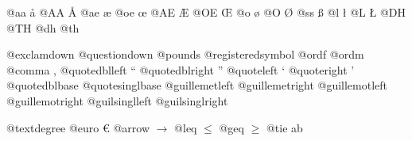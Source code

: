 \documentclass{book}
\begin{document}
\begin{titlepage}
@aa \aa{}
@AA \AA{}
@ae \ae{}
@oe \oe{}
@AE \AE{}
@OE \OE{}
@o \o{}
@O \O{}
@ss \ss{}
@l \l{}
@L \L{}
@DH \DH{}
@TH \TH{}
@dh \dh{}
@th \th{}

@exclamdown \textexclamdown{}
@questiondown \textquestiondown{}
@pounds \textsterling{}
@registeredsymbol \circledR{}
@ordf \textordfeminine{}
@ordm \textordmasculine{}
@comma ,
@quotedblleft \textquotedblleft{}
@quotedblright \textquotedblright{}
@quoteleft \textquoteleft{}
@quoteright \textquoteright{}
@quotedblbase \quotedblbase{}
@quotesinglbase \quotesinglbase{}
@guillemetleft \guillemotleft{}
@guillemetright \guillemotright{}
@guillemotleft \guillemotleft{}
@guillemotright \guillemotright{}
@guilsinglleft \guilsinglleft{}
@guilsinglright \guilsinglright{}

@textdegree \textdegree{}
@euro \euro{}
@arrow $\rightarrow{}$
@leq $\leq{}$
@geq $\geq{}$
@tie a\hbox{}b


\end{titlepage}
\end{document}
